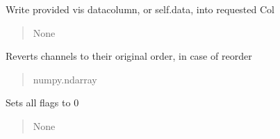 \documentclass[letterpaper,10pt,english]{sphinxmanual}
\begin{document}
\begin{fulllineitems}
\begin{fulllineitems}
\label{\detokenize{api/killMS.Data:killMS.Data.ClassMS.ClassMS.SaveVis}}
\pysigstartsignatures
{}
\pysigstopsignatures
\sphinxAtStartPar
Write provided vis datacolumn, or self.data, into requested Col
\begin{quote}\begin{description}
\sphinxAtStartPar
None

\end{description}\end{quote}

\end{fulllineitems}


\begin{fulllineitems}
\label{\detokenize{api/killMS.Data:killMS.Data.ClassMS.ClassMS.ToOrigFreqOrder}}
\pysigstartsignatures
{}
\pysigstopsignatures
\sphinxAtStartPar
Reverts channels to their original order, in case of reorder
\begin{quote}\begin{description}
\sphinxAtStartPar
numpy.ndarray

\end{description}\end{quote}

\end{fulllineitems}


\begin{fulllineitems}
\label{\detokenize{api/killMS.Data:killMS.Data.ClassMS.ClassMS.ZeroFlagSave}}
\pysigstartsignatures
{}
\pysigstopsignatures
\sphinxAtStartPar
Sets all flags to 0
\begin{quote}\begin{description}
\sphinxAtStartPar
None


\end{description}
\end{quote}
\end{fulllineitems}
\end{fulllineitems}
\end{document}
